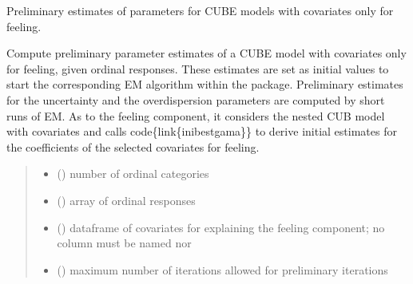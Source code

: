 \documentclass[letterpaper,10pt,english]{sphinxmanual}
\begin{document}

\begin{fulllineitems}
\label{\detokenize{cubmods:cubmods.cube_0w0.init_theta}}
\pysigstartsignatures
{}
\pysigstopsignatures
\sphinxAtStartPar
Preliminary estimates of parameters for CUBE models with covariates only for feeling.

\sphinxAtStartPar
Compute preliminary parameter estimates of a CUBE model with covariates only for feeling, given
ordinal responses. These estimates are set as initial values to start the corresponding E\sphinxhyphen{}M algorithm within the package.
Preliminary estimates for the uncertainty and the overdispersion parameters are computed by short runs of EM. 
As to the feeling component, it considers the nested CUB model with covariates and calls code\{link\{inibestgama\}\} to derive initial estimates for the coefficients
of the selected covariates for feeling.
\begin{quote}\begin{description}
\begin{itemize}
\item {} 
\sphinxAtStartPar
{} () \textendash{} number of ordinal categories

\item {} 
\sphinxAtStartPar
{} () \textendash{} array of ordinal responses

\item {} 
\sphinxAtStartPar
{} () \textendash{} dataframe of covariates for explaining the feeling component;
no column must be named  nor 

\item {} 
\sphinxAtStartPar
{} () \textendash{} maximum number of iterations allowed for preliminary iterations


\end{itemize}
\end{description}
\end{quote}
\end{fulllineitems}
\end{document}
